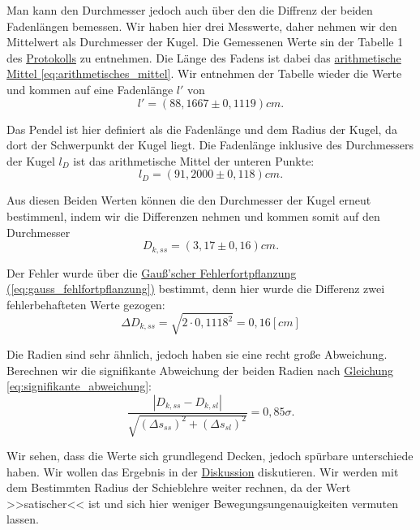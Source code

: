 Man kann den Durchmesser jedoch auch über den die Diffrenz der beiden Fadenlängen bemessen. Wir haben hier drei Messwerte, daher nehmen wir den Mittelwert als Durchmesser der Kugel. Die Gemessenen Werte sin der Tabelle 1 des \hyperref[Protokoll]{Protokolls} zu entnehmen. Die Länge des Fadens ist dabei das \hyperref[eq:arithmetisches_mittel]{arithmetische Mittel \ref*{eq:arithmetisches_mittel}}. Wir entnehmen der Tabelle wieder die Werte und kommen auf eine Fadenlänge $l'$ von
\begin{equation}
    l' = (88,1667 \pm 0,1119) cm.
\end{equation}

Das Pendel ist hier definiert als die Fadenlänge und dem Radius der Kugel, da dort der Schwerpunkt der Kugel liegt. Die Fadenlänge inklusive des Durchmessers der Kugel $l_D$ ist das arithmetische Mittel der unteren Punkte:
\begin{equation}
    l_D = (91,2000 \pm 0,118) cm.
\end{equation}

Aus diesen Beiden Werten können die den Durchmesser der Kugel erneut bestimmenl, indem wir die Differenzen nehmen und kommen somit auf den Durchmesser
\begin{equation}
    D_{k,ss} = (3,17 \pm 0,16)cm.
\end{equation}

Der Fehler wurde über die \hyperref[eq:gauss_fehlfortpflanzung]{Gauß'scher Fehlerfortpflanzung (\ref*{eq:gauss_fehlfortpflanzung})} bestimmt, denn hier wurde die Differenz zwei fehlerbehafteten Werte gezogen:
\begin{equation}
    \Delta D_{k,ss} = \sqrt{2 \cdot 0,1118^2} = 0,16 [cm]
\end{equation}

Die Radien sind sehr ähnlich, jedoch haben sie eine recht große Abweichung. Berechnen wir die signifikante Abweichung der beiden Radien nach \hyperref[eq:signifikante_abweichung]{Gleichung \ref*{eq:signifikante_abweichung}}:
\begin{equation}
    \frac{\left| D_{k,ss} - D_{k,sl} \right|}{\sqrt{(\Delta s_{ss})^2 + (\Delta s_{sl})^2 }} = 0,85\sigma.
\end{equation}

Wir sehen, dass die Werte sich grundlegend Decken, jedoch spürbare unterschiede haben. Wir wollen das Ergebnis in der \hyperref[ch:diskussion]{Diskussion} diskutieren. Wir werden mit dem Bestimmten Radius der Schieblehre weiter rechnen, da der Wert >>satischer<< ist und sich hier weniger Bewegungsungenauigkeiten vermuten lassen.

